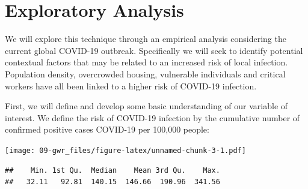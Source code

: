 \documentclass[
]{book}
\newenvironment{Shaded}{\begin{snugshade}}{\end{snugshade}}
\newcommand{\AttributeTok}[1]{\textcolor[rgb]{0.77,0.63,0.00}{#1}}
\newcommand{\CommentTok}[1]{\textcolor[rgb]{0.56,0.35,0.01}{\textit{#1}}}
\newcommand{\DecValTok}[1]{\textcolor[rgb]{0.00,0.00,0.81}{#1}}
\newcommand{\FloatTok}[1]{\textcolor[rgb]{0.00,0.00,0.81}{#1}}
\newcommand{\FunctionTok}[1]{\textcolor[rgb]{0.00,0.00,0.00}{#1}}
\newcommand{\NormalTok}[1]{#1}
\newcommand{\OtherTok}[1]{\textcolor[rgb]{0.56,0.35,0.01}{#1}}
\newcommand{\SpecialCharTok}[1]{\textcolor[rgb]{0.00,0.00,0.00}{#1}}
\newcommand{\StringTok}[1]{\textcolor[rgb]{0.31,0.60,0.02}{#1}}
\begin{document}
\hypertarget{exploratory-analysis}{%
\section{Exploratory Analysis}\label{exploratory-analysis}}

We will explore this technique through an empirical analysis considering the current global COVID-19 outbreak. Specifically we will seek to identify potential contextual factors that may be related to an increased risk of local infection. Population density, overcrowded housing, vulnerable individuals and critical workers have all been linked to a higher risk of COVID-19 infection.

First, we will define and develop some basic understanding of our variable of interest. We define the risk of COVID-19 infection by the cumulative number of confirmed positive cases COVID-19 per 100,000 people:

\begin{Shaded}
\end{Shaded}

\texttt{[image: 09-gwr\_files/figure-latex/unnamed-chunk-3-1.pdf]}

\begin{Shaded}
\end{Shaded}

\begin{verbatim}
##    Min. 1st Qu.  Median    Mean 3rd Qu.    Max. 
##   32.11   92.81  140.15  146.66  190.96  341.56
\end{verbatim}
\end{document}
